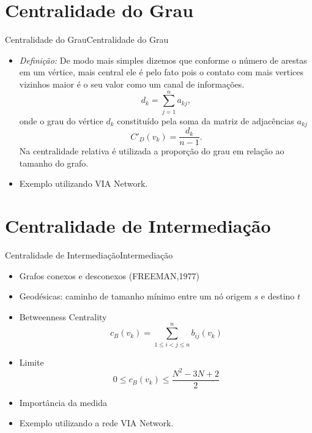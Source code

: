 \documentclass[10pt]{beamer}
\begin{document}
\section{Centralidade do Grau}
\begin{frame}{Centralidade do Grau}{Centralidade do Grau}
\begin{itemize}
\item \textit{Definição:} De modo mais simples dizemos que conforme o número de arestas em um vértice, mais central ele é pelo fato pois o contato com mais vertices vizinhos maior é o seu valor como um canal de informações.
\begin{equation}
d_k= \sum_{j=1}^n a_{kj},
\end{equation}
onde o grau do vértice $d_k$ constituído pela soma da matriz de adjacências $a_{kj}$
\begin{equation}
C'_D(v_k) = \frac{d_k}{n-1}.
\end{equation}
Na centralidade relativa é utilizada a proporção do grau em relação ao tamanho do grafo.
\item Exemplo utilizando VIA Network.
\end{itemize}
\end{frame}

\section{Centralidade de Intermediação}
\begin{frame}{Centralidade de Intermediação}{Intermediação}
\begin{itemize}
\item Grafos conexos e desconexos (FREEMAN,1977)
\item Geodésicas: caminho de tamanho mínimo entre um nó origem $s$ e destino $t$
\item Betweenness Centrality\begin{equation} 
		c_B(v_k)=\sum_{1\leqslant i < j \leqslant n}^{n} b_{ij}(v_k) 
		\end{equation}
\item Limite
\begin{equation}
0 \leqslant c_B(v_k) \leqslant\frac{N^2-3N+2}{2}
\end{equation}
\item Importância da medida
\item Exemplo utilizando a rede VIA Network.
\end{itemize}
\end{frame}
\end{document}
